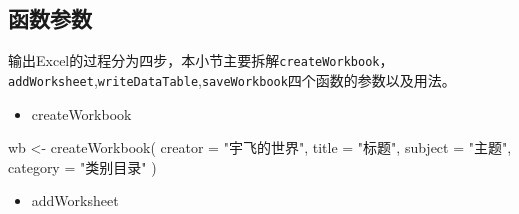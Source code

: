 \documentclass[
]{book}
\newenvironment{Shaded}{\begin{snugshade}}{\end{snugshade}}
\newcommand{\AttributeTok}[1]{\textcolor[rgb]{0.77,0.63,0.00}{#1}}
\newcommand{\ConstantTok}[1]{\textcolor[rgb]{0.00,0.00,0.00}{#1}}
\newcommand{\FunctionTok}[1]{\textcolor[rgb]{0.00,0.00,0.00}{#1}}
\newcommand{\NormalTok}[1]{#1}
\newcommand{\OtherTok}[1]{\textcolor[rgb]{0.56,0.35,0.01}{#1}}
\newcommand{\SpecialCharTok}[1]{\textcolor[rgb]{0.00,0.00,0.00}{#1}}
\newcommand{\StringTok}[1]{\textcolor[rgb]{0.31,0.60,0.02}{#1}}
\providecommand{\tightlist}{%
  \setlength{\itemsep}{0pt}\setlength{\parskip}{0pt}}
\begin{document}
\hypertarget{ux51fdux6570ux53c2ux6570}{%
\subsection{函数参数}\label{ux51fdux6570ux53c2ux6570}}

输出Excel的过程分为四步，本小节主要拆解\texttt{createWorkbook}，\texttt{addWorksheet},\texttt{writeDataTable},\texttt{saveWorkbook}四个函数的参数以及用法。

\begin{itemize}
\tightlist
\item
  createWorkbook
\end{itemize}

\begin{Shaded}
\end{Shaded}

\begin{Shaded}
\begin{Highlighting}[]
\NormalTok{wb }\OtherTok{\textless{}{-}} \FunctionTok{createWorkbook}\NormalTok{(}
  \AttributeTok{creator =} \StringTok{"宇飞的世界"}\NormalTok{,}
  \AttributeTok{title =} \StringTok{"标题"}\NormalTok{,}
  \AttributeTok{subject =} \StringTok{"主题"}\NormalTok{,}
  \AttributeTok{category =} \StringTok{"类别目录"}
\NormalTok{)}
\end{Highlighting}
\end{Shaded}

\begin{itemize}
\tightlist
\item
  addWorksheet
\end{itemize}
\end{document}
